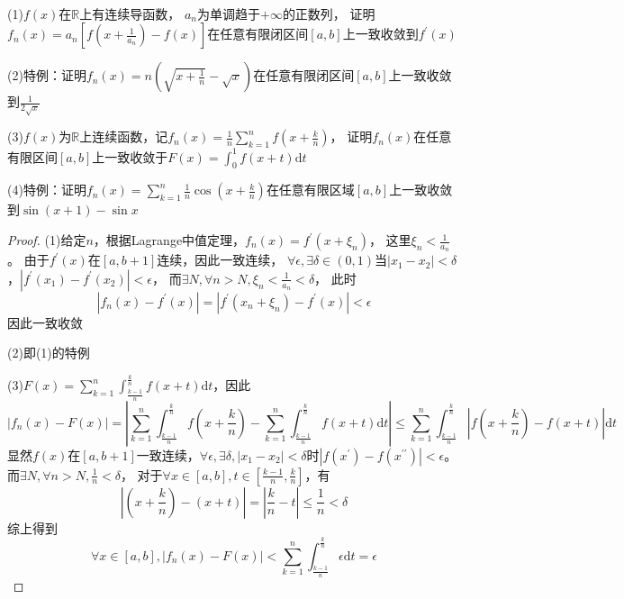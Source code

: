 ~

\begin{exercise}[导数与积分一致收敛]
  (1)$f(x)$在$\mathbb{R}$上有连续导函数，
  $a_n$为单调趋于$+\infty$的正数列，
  证明$f_n(x) = a_n \left[ f \left( x + \frac{1}{a_n} \right) - f(x) \right]$在任意有限闭区间$[a,b]$上一致收敛到$f^{\prime}(x)$

  (2)特例：证明$f_n(x) = n \left( \sqrt{x + \frac{1}{n}} - \sqrt{x} \right)$在任意有限闭区间$[a,b]$上一致收敛到$\frac{1}{2 \sqrt{x}}$

  (3)$f(x)$为$\mathbb{R}$上连续函数，记$f_n(x) = \frac{1}{n} \sum\limits_{k = 1}^n f \left( x + \frac{k}{n} \right)$，
  证明$f_n(x)$在任意有限区间$[a,b]$上一致收敛于$F(x) = \int_0^1 f(x+t)\mathrm{d} t$

  (4)特例：证明$f_n(x) = \sum\limits_{k = 1}^n \frac{1}{n}\cos \left( x + \frac{k}{n} \right)$在任意有限区域$[a,b]$上一致收敛到$\sin(x+1) - \sin x$
\end{exercise}

\begin{proof}
  (1)给定$n$，根据Lagrange中值定理，$f_n(x) = f^{\prime}(x + \xi_n)$，
  这里$\xi_n < \frac{1}{a_n}$。
  由于$f^{\prime}(x)$在$[a,b+1]$连续，因此一致连续，
  $\forall \epsilon, \exists \delta \in (0,1)$当$|x_1 - x_2|< \delta$，$|f^{\prime}(x_1) - f^{\prime}(x_2)| < \epsilon$，
  而$\exists N, \forall n > N, \xi_n < \frac{1}{a_n} < \delta$，
  此时
  \begin{equation*}
    |f_n(x) - f^{\prime}(x)| = |f^{\prime}(x_n + \xi_n) - f^{\prime}(x)| < \epsilon
  \end{equation*}
  因此一致收敛

  (2)即(1)的特例

  (3)$F(x) = \sum\limits_{k = 1}^n \int _{\frac{k-1}{n}}^{\frac{k}{n}}f(x+t)\mathrm{d} t$，因此
  \begin{equation*}
    |f_n(x) - F(x)| = \left| \sum\limits_{k = 1}^n \int_{\frac{k-1}{n}}^{\frac{k}{n}} f \left( x + \frac{k}{n} \right) - \sum\limits_{k = 1}^n \int_{\frac{k-1}{n}}^{\frac{k}{n}}f (x+t)\mathrm{d} t \right| \leq \sum\limits_{k = 1}^n \int_{\frac{k-1}{n}}^{\frac{k}{n}} \left| f \left( x + \frac{k}{n} \right) - f(x+t) \right|\mathrm{d} t
  \end{equation*}
  显然$f(x)$在$[a,b+1]$一致连续，$\forall \epsilon, \exists \delta, |x_1 - x_2|<\delta$时$|f(x^{\prime}) - f(x^{\prime\prime})| < \epsilon$。
  而$\exists N, \forall n > N, \frac{1}{n} < \delta$，
  对于$\forall x \in [a,b], t \in \left[ \frac{k-1}{n}, \frac{k}{n} \right]$，有
  \begin{equation*}
    \left| \left( x + \frac{k}{n} \right) - (x+t) \right| = \left| \frac{k}{n} - t \right| \leq \frac{1}{n}< \delta
  \end{equation*}
  综上得到
  \begin{equation*}
   \forall x \in [a,b], |f_n(x) - F(x)| < \sum\limits_{k = 1}^n \int_{\frac{k-1}{n}}^{\frac{k}{n}} \epsilon \mathrm{d} t = \epsilon
  \end{equation*}
\end{proof}


